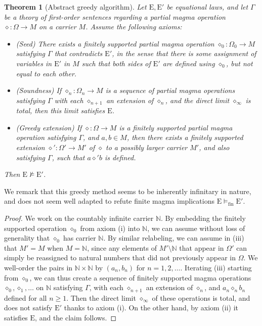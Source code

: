 \documentclass[12pt]{amsart}
\newtheorem{theorem}{Theorem}[section]
\theoremstyle{definition}
\newcommand{\N}{\mathbb{N}}
\newcommand{\op}{\diamond}
\newcommand{\nmodels}{\not\models}
\newcommand{\modelsfin}{\models_{\mathrm{fin}}}
\newcommand{\E}{\mathrm{E}}
\begin{document}
\begin{theorem}[Abstract greedy algorithm]\label{greedy-abstract} Let $\E,{\E'}$ be equational laws, and let $\Gamma$ be a theory of first-order sentences regarding a partial magma operation $\op \colon \Omega \to M$ on a carrier $M$.  Assume the following axioms:
  \setlength{\parskip}{0pt}
\begin{itemize}
  \item[(i)] (Seed) There exists a finitely supported partial magma operation $\op_0 \colon \Omega_0 \to M$ satisfying $\Gamma$ that contradicts ${\E'}$, in the sense that there is some assignment of variables in ${\E'}$ in $M$ such that both sides of ${\E'}$ are defined using $\op_0$, but not equal to each other.
  \item[(ii)]  (Soundness)  If $\op_n \colon \Omega_n \to M$ is a sequence of partial magma operations satisfying $\Gamma$ with each $\op_{n+1}$ an extension of $\op_n$, and the direct limit $\op_\infty$ is total, then this limit satisfies $\E$.
  \item[(iii)] (Greedy extension)  If $\op \colon \Omega \to M$ is a finitely supported partial magma operation satisfying $\Gamma$, and $a,b \in M$, then there exists a finitely supported extension $\op' \colon \Omega' \to M'$ of $\op$ to a possibly larger carrier $M'$, and also satisfying $\Gamma$, such that $a \op' b$ is defined.
\end{itemize}
Then $\E \nmodels {\E'}$.
\end{theorem}

We remark that this greedy method seems to be inherently infinitary in nature, and does not seem well adapted to refute finite magma implications $\E \modelsfin {\E'}$.

\begin{proof}  We work on the countably infinite carrier $\N$.  By embedding the finitely supported operation $\op_0$ from axiom (i) into $\N$, we can assume without loss of generality that $\op_0$ has carrier $\N$.  By similar relabeling, we can assume in (iii) that $M' = M$ when $M=\N$, since any elements of $M' \setminus \N$ that
appear in $\Omega'$ can simply be reassigned to natural numbers that did not previously appear in $\Omega$.  We well-order the pairs in $\N \times \N$ by $(a_n,b_n)$ for $n=1,2,\dots$.  Iterating (iii) starting from $\op_0$, we can thus create a sequence of finitely supported magma operations $\op_0, \op_1, \dots$ on $\N$ satisfying $\Gamma$, with each $\op_{n+1}$ an extension of $\op_n$, and $a_n \op_n b_n$ defined for all $n \geq 1$.  Then the direct limit $\op_\infty$ of these operations is total, and does not satisfy ${\E'}$ thanks to axiom (i).  On the other hand, by axiom (ii) it satisfies $\E$, and the claim follows.
\end{proof}
\end{document}
